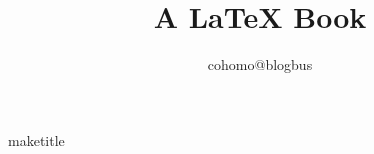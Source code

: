 \documentclass{book}
\begin{document}
\title{A LaTeX Book}

\author{cohomo@blogbus}

\date{}maketitle





%
\end{document}
